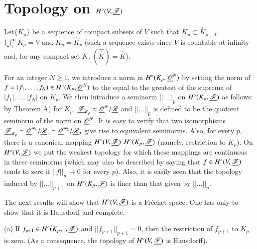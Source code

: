 \setcounter{section}{1}
\section{Topology on \texorpdfstring{$H^\circ(V, \text{\underline{$\mathscr{F}$}})$}{HV}}%

Let\pageoriginale $\{K_p\}$ be a sequence of compact subsets of $V$
such that $K_p \subset \overset{\circ}{K}_{p+1}$,
$\bigcup\limits^\infty_1 K_p = V$ and $K_p = \hat{K}_p$ (such a
sequence exists since $V$ is eountable at infinity and, for any
compact set $K$, $(\hat{\hat{K}}) = \hat{K}$).

For an integer $N \geq 1$, we introduce a norm in $H^\circ (K_p,
\underline{\mathscr{O}}^N)$ by setting the norm of $f = (f_1, \ldots, f_N) \in
H^\circ (K_p, \underline{\mathscr{O}}^N)$ to the equal to the greatest of the
suprema of $|f_1|, \ldots, |f_N|$ on $K_p$. We then introduce a
seminorm $||\ldots ||_p$ on $H^\circ (K_p, \underline{\mathscr{F}})$ as
follows: by Theorem A) for $K_p$, $\underline{\mathscr{F}}_{K_p} \simeq
\underline{\mathscr{O}}^N /\underline{\mathscr{R}}$ and $|| \ldots ||_p$ is defined to
be the quotient seminorm of the norm on $\underline{\mathscr{O}}^N$. It is
easy to verify that two isomorphisms $\underline{\mathscr{F}}_{K_p} \simeq
\underline{\mathscr{O}}^{N_1}/ \underline{\mathscr{R}}_1 \simeq \underline{\mathscr{O}}^{N_2}/
\underline{\mathscr{R}}_2$ give rise to equivalent seminorms. Also, for every
$p$, there is a canonical mapping $H^\circ (V, \underline{\mathscr{F}})$
$H^\circ(K_p, \underline{\mathscr{F}})$ (namely, restriction to $K_p$). On
$H^\circ (V, \underline{\mathscr{F}})$ we put the weakest topology for which
these mappings are continuous in these seminorms (which may also be
described by saying that $f \in H^\circ (V, \underline{\mathscr{F}})$ tends to
zero if $||f||_p \to 0$ for every $p$). Also, it is easily seen that
the topology induced by $||\ldots ||_{p+1}$ on $H^\circ (K_p,
\underline{\mathscr{F}})$ is finer than that given by $|| \ldots ||_p$. 

The next results will show that $H^\circ (V,\underline{\mathscr{F}})$ is a
Fr\'echet space. One has only to show that it is Hausdorff and
complete.

(a) If $f_{p+1} \in H^\circ (K_{p+1}, \underline{\mathscr{F}})$ and
$||f_{p+1}||_{p+1} =0$, then the restriction of $f_{p+1}$ to $K_p$ is
zero. (As a consequence, the topology of $H^\circ (V,
\underline{\mathscr{F}})$ is Hausdorff).

